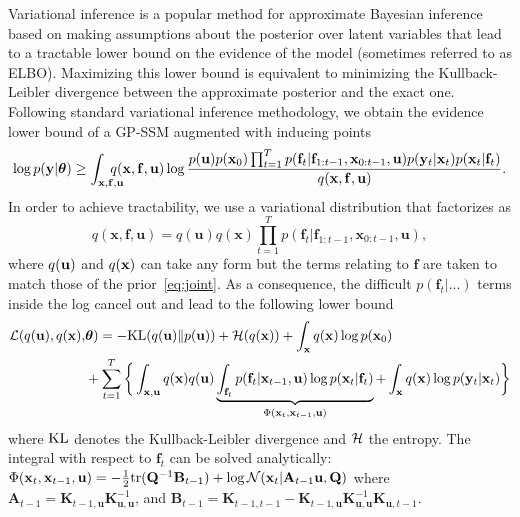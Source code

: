 \documentclass{article} %
\newcommand{\n}[1]{\mathbf{#1}}
\newcommand{\x}{\mathbf{x}}
\newcommand{\y}{\mathbf{y}}
\newcommand{\btheta}{\boldsymbol\theta}
\begin{document}
Variational inference \citep{Bishop2006} is a popular method for approximate Bayesian inference based on making assumptions about the posterior over latent variables that lead to a tractable lower bound on the evidence of the model (sometimes referred to as ELBO). Maximizing this lower bound is equivalent to minimizing the Kullback-Leibler divergence between the approximate posterior and the exact one. Following standard variational inference methodology, \citep{Bishop2006} we obtain the evidence lower bound of a GP-SSM augmented with inducing points
\begin{equation}
	\log p(\by|\btheta) \geq \int_{\bx, \bff, \bu} \!\!\!\!\!\!\! q(\bx, \bff, \bu) \log \frac{p(\n{u}) p(\x_0) \prod_{t=1}^T p(\n{f}_t | \n{f}_{1:t-1},\x_{0:t-1},\n{u}) p(\y_t | \x_t) p(\x_t | \n{f}_t)}{q(\bx, \bff, \bu)}. \label{eq:elboint} 
\end{equation}
In order to achieve tractability, we use a variational distribution that factorizes as
\begin{equation}
\label{eq:vardist}
q(\x,\n{f},\n{u}) = q(\n{u}) q(\x) \prod_{t=1}^T p(\n{f}_t | \n{f}_{1:t-1},\x_{0:t-1},\n{u}),
\end{equation}
where $q({\bf u})$ and $q({\bf x})$ can take any form but the terms relating to $\n{f}$ are taken to match those of the prior~\eqref{eq:joint}. As a consequence, the difficult $p(\n{f}_t |...)$ terms inside the log cancel out and lead to the following lower bound
\begin{align}
\mathcal{L}(q(\bu), q(\bx), &\bta) = -\KL(q(\bu) \| p(\bu)) + \cH(q(\bx)) + \int_{\bx} q(\bx) \log p(\bx_0) \nn\\
& + \sum_{t=1}^T \bigg\{ \int_{\bx,\bu} q(\bx) q(\bu) \underbrace{\int_{\bff_t} p(\n{f}_t | \x_{t-1},\n{u}) \log p(\x_t | \n{f}_t)}_{\Phi(\bx_t, \bx_{t-1}, \bu)}
 + \int_{\bx} q(\bx) \log p(\by_t | \x_t) \bigg\} \label{eq:elbo}
\end{align}
where $\mbox{KL}$ denotes the Kullback-Leibler divergence and ${\cal H}$ the entropy. The integral with respect to $\n{f}_t$ can be solved analytically:
$
\Phi(\bx_t, \bx_{t-1}, \bu) = -\frac{1}{2}{\rm tr}(\n{Q}^{-1} \bB_{t-1}) + \log \cN(\x_t |\n{A}_{t-1} \bu, \n{Q})
$
where $\n{A}_{t-1} = \n{K}_{t-1,\n{u}} \n{K}_{\n{u},\n{u}}^{-1}$, and $\n{B}_{t-1} = \n{K}_{t-1,t-1} - \n{K}_{t-1,\n{u}} \n{K}_{\n{u},\n{u}}^{-1} \n{K}_{\n{u},t-1}$.
\end{document}
